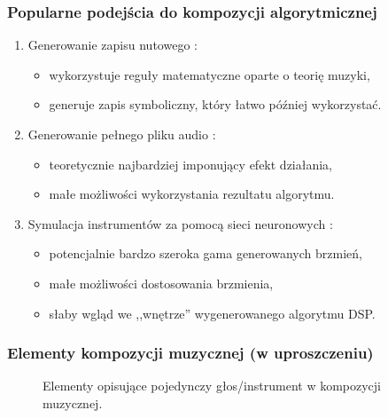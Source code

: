 \documentclass[]{beamer}
\begin{document}
\begin{frame}
  \frametitle{Popularne podejścia do kompozycji algorytmicznej}

  \begin{enumerate}
    \item Generowanie zapisu nutowego \cite{language_models_drummers}:
      \begin{itemize}
        \item wykorzystuje reguły matematyczne oparte o teorię muzyki,
        \item generuje zapis symboliczny, który łatwo później wykorzystać.
      \end{itemize}
    \item Generowanie pełnego pliku audio \cite{riffusion}:
      \begin{itemize}
        \item teoretycznie najbardziej imponujący efekt działania,
        \item małe możliwości wykorzystania rezultatu algorytmu.
      \end{itemize}
    \item Symulacja instrumentów za pomocą sieci neuronowych \cite{nsynth}:
      \begin{itemize}
        \item potencjalnie bardzo szeroka gama generowanych brzmień,
        \item małe możliwości dostosowania brzmienia,
        \item słaby wgląd we ,,wnętrze'' wygenerowanego algorytmu DSP.
      \end{itemize}
  \end{enumerate}
\end{frame}

\begin{frame}
  \frametitle{Elementy kompozycji muzycznej (w uproszczeniu)}
  \begin{figure}[H]
    \centering\small
    \begin{center}
    \end{center}
    \caption{
      Elementy opisujące pojedynczy głos/instrument w kompozycji muzycznej. 
    }
    \label{telemetry_backend_asyncio}
  \end{figure}
\end{frame}
\end{document}
